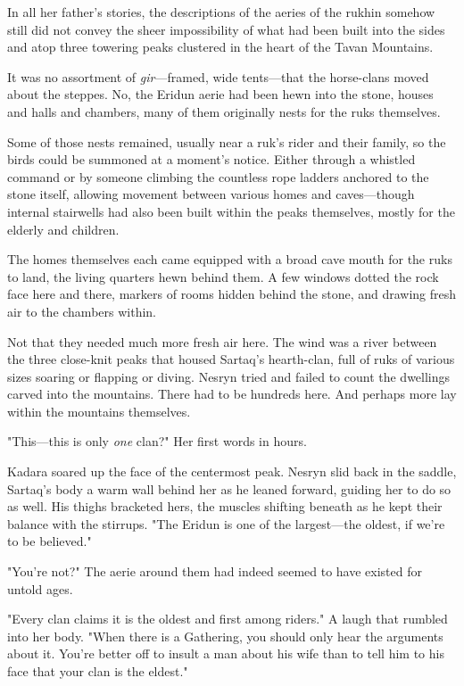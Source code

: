 In all her father's stories, the descriptions of the aeries of the rukhin somehow still did not convey the sheer impossibility of what had been built into the sides and atop three towering peaks clustered in the heart of the Tavan Mountains.

It was no assortment of \emph{gir}---framed, wide tents---that the horse-clans moved about the steppes.
No, the Eridun aerie had been hewn into the stone, houses and halls and chambers, many of them originally nests for the ruks themselves.

Some of those nests remained, usually near a ruk's rider and their family, so the birds could be summoned at a moment's notice.
Either through a whistled command or by someone climbing the countless rope ladders anchored to the stone itself, allowing movement between various homes and caves---though internal stairwells had also been built within the peaks themselves, mostly for the elderly and children.

The homes themselves each came equipped with a broad cave mouth for the ruks to land, the living quarters hewn behind them.
A few windows dotted the rock face here and there, markers of rooms hidden behind the stone, and drawing fresh air to the chambers within.

Not that they needed much more fresh air here.
The wind was a river between the three close-knit peaks that housed Sartaq's hearth-clan, full of ruks of various sizes soaring or flapping or diving.
Nesryn tried and failed to count the dwellings carved into the mountains.
There had to be hundreds here.
And perhaps more lay within the mountains themselves.

"This---this is only \emph{one} clan?"
Her first words in hours.

Kadara soared up the face of the centermost peak.
Nesryn slid back in the saddle, Sartaq's body a warm wall behind her as he leaned forward, guiding her to do so as well.
His thighs bracketed hers, the muscles shifting beneath as he kept their balance with the stirrups.
"The Eridun is one of the largest---the oldest, if we're to be believed."

"You're not?"
The aerie around them had indeed seemed to have existed for untold ages.

"Every clan claims it is the oldest and first among riders."
A laugh that rumbled into her body.
"When there is a Gathering, you should only hear the arguments about it.
You're better off to insult a man about his wife than to tell him to his face that your clan is the eldest."

